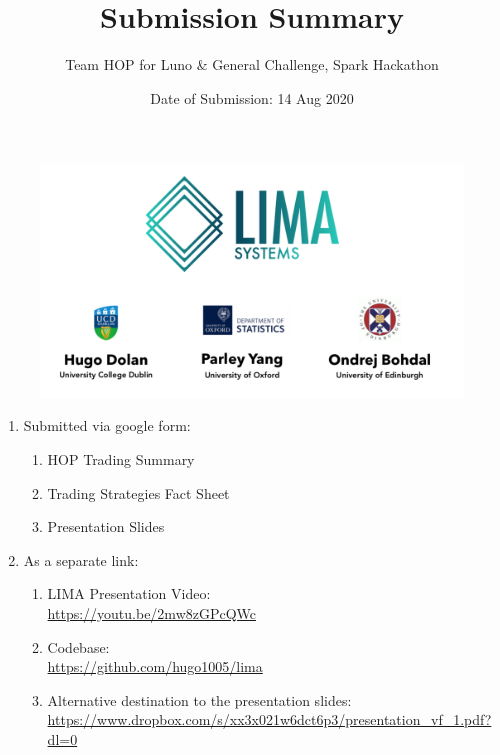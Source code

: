 \documentclass[12pt,a4paper]{article}
\author{%
	Team HOP for Luno \& General Challenge, Spark Hackathon }
\title{Submission Summary}
\date{Date of Submission: 14 Aug 2020}
\begin{document}
\maketitle

\begin{figure}[h]
	\centering
	\includegraphics[width=\linewidth]{../Logo}
\end{figure}



\vfill
\begin{enumerate}
	\item Submitted via google form:
\begin{enumerate}
	\item 	HOP Trading Summary
	\item Trading Strategies Fact Sheet
	\item Presentation Slides 
\end{enumerate}
\item As a separate link:
\begin{enumerate}
	\item LIMA Presentation Video: \\ \url{https://youtu.be/2mw8zGPcQWc}
	\item Codebase: \\
	\url{https://github.com/hugo1005/lima}
	\item Alternative destination to the presentation slides: \\ \url{https://www.dropbox.com/s/xx3x021w6dct6p3/presentation_vf_1.pdf?dl=0} 
\end{enumerate}
\end{enumerate}

\vfill

\thispagestyle{empty}
\end{document}
